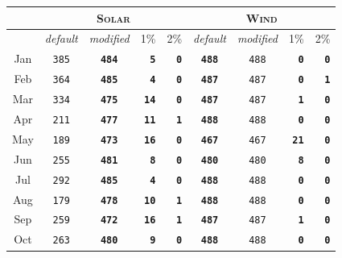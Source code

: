 \documentclass[main.tex]{subfiles}
\begin{document}
\begin{table}[]
    \centering
    \begin{tabular}{c|ccrr|ccrr}
\toprule
\multicolumn{1}{c}{} & \multicolumn{4}{c}{\textsc{Solar}} & \multicolumn{4}{c}{\textsc{Wind}} \\
\midrule
\multicolumn{1}{c}{} & 
\multicolumn{1}{c}{\textit{default}} & \multicolumn{1}{c}{\textit{modified}} & 
\multicolumn{1}{c}{1\%} & \multicolumn{1}{c}{2\%} & 
\multicolumn{1}{c}{\textit{default}} & \multicolumn{1}{c}{\textit{modified}} & 
\multicolumn{1}{c}{1\%} & \multicolumn{1}{c}{2\%} \\
\midrule
Jan & \texttt{385} & \texttt{\textbf{484}} & \texttt{\textbf{5}} & \texttt{\textbf{0}} & \texttt{\textbf{488}} & \texttt{488} & \texttt{\textbf{0}} & \texttt{\textbf{0}} \\
Feb & \texttt{364} & \texttt{\textbf{485}} & \texttt{\textbf{4}} & \texttt{\textbf{0}} & \texttt{\textbf{487}} & \texttt{487} & \texttt{\textbf{0}} & \texttt{\textbf{1}} \\
Mar & \texttt{334} & \texttt{\textbf{475}} & \texttt{\textbf{14}} & \texttt{\textbf{0}} & \texttt{\textbf{487}} & \texttt{487} & \texttt{\textbf{1}} & \texttt{\textbf{0}} \\
Apr & \texttt{211} & \texttt{\textbf{477}} & \texttt{\textbf{11}} & \texttt{\textbf{1}} & \texttt{\textbf{488}} & \texttt{488} & \texttt{\textbf{0}} & \texttt{\textbf{0}} \\
May & \texttt{189} & \texttt{\textbf{473}} & \texttt{\textbf{16}} & \texttt{\textbf{0}} & \texttt{\textbf{467}} & \texttt{467} & \texttt{\textbf{21}} & \texttt{\textbf{0}} \\
Jun & \texttt{255} & \texttt{\textbf{481}} & \texttt{\textbf{8}} & \texttt{\textbf{0}} & \texttt{\textbf{480}} & \texttt{480} & \texttt{\textbf{8}} & \texttt{\textbf{0}} \\
Jul & \texttt{292} & \texttt{\textbf{485}} & \texttt{\textbf{4}} & \texttt{\textbf{0}} & \texttt{\textbf{488}} & \texttt{488} & \texttt{\textbf{0}} & \texttt{\textbf{0}} \\
Aug & \texttt{179} & \texttt{\textbf{478}} & \texttt{\textbf{10}} & \texttt{\textbf{1}} & \texttt{\textbf{488}} & \texttt{488} & \texttt{\textbf{0}} & \texttt{\textbf{0}} \\
Sep & \texttt{259} & \texttt{\textbf{472}} & \texttt{\textbf{16}} & \texttt{\textbf{1}} & \texttt{\textbf{487}} & \texttt{487} & \texttt{\textbf{1}} & \texttt{\textbf{0}} \\
Oct & \texttt{263} & \texttt{\textbf{480}} & \texttt{\textbf{9}} & \texttt{\textbf{0}} & \texttt{\textbf{488}} & \texttt{488} & \texttt{\textbf{0}} & \texttt{\textbf{0}} \\

\end{tabular}
\end{table}
\end{document}
